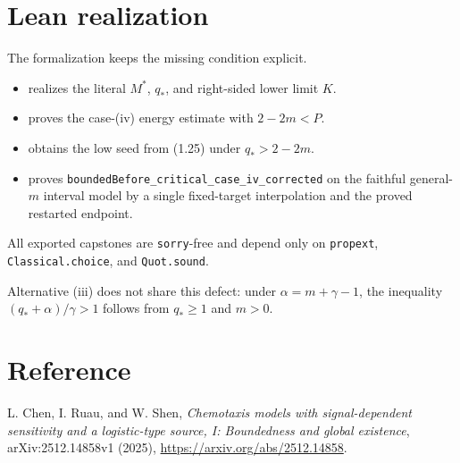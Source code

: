 \documentclass[11pt]{article}
\begin{document}
\section{Lean realization}

The formalization keeps the missing condition explicit.
\begin{itemize}[leftmargin=2em]
\item {} realizes the
literal \(M^*\), \(q_*\), and right-sided lower limit \(K\).
\item {} proves the case-(iv)
energy estimate with \(2-2m<P\).
\item {} obtains the low
seed from (1.25) under \(q_*>2-2m\).
\item {} proves
\texttt{boundedBefore\_critical\_case\_iv\_corrected} on the faithful
general-\(m\) interval model by a single fixed-target interpolation and the
proved restarted endpoint.
\end{itemize}
All exported capstones are \texttt{sorry}-free and depend only on
\texttt{propext}, \texttt{Classical.choice}, and \texttt{Quot.sound}.

Alternative (iii) does not share this defect: under
\(\alpha=m+\gamma-1\), the inequality
\((q_*+\alpha)/\gamma>1\) follows from \(q_*\geq1\) and \(m>0\).

\section*{Reference}

L. Chen, I. Ruau, and W. Shen, \emph{Chemotaxis models with signal-dependent
sensitivity and a logistic-type source, I: Boundedness and global existence},
arXiv:2512.14858v1 (2025),
\url{https://arxiv.org/abs/2512.14858}.
\end{document}
